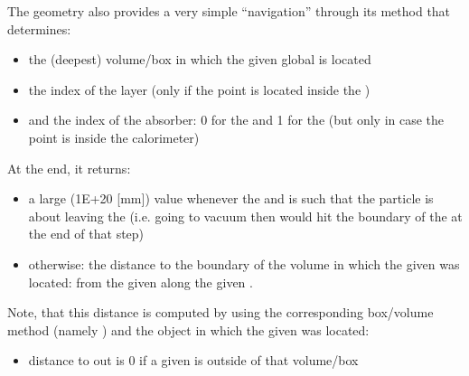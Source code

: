 \documentclass[letterpaper,10pt,english]{sphinxmanual}
\begin{document}
\begin{fulllineitems}
\sphinxAtStartPar
The geometry also provides a very simple “navigation” through its  method that determines:\begin{itemize}
\item {} 
\sphinxAtStartPar
the (deepest) volume/box in which the given global  is located

\item {} 
\sphinxAtStartPar
the index of the layer (only if the point is located inside the )

\item {} 
\sphinxAtStartPar
and the index of the absorber: 0 for the  and 1 for the  (but only in case the point is inside the calorimeter)

\end{itemize}


\sphinxAtStartPar
At the end, it returns:\begin{itemize}
\item {} 
\sphinxAtStartPar
a large (1E+20 {[}mm{]}) value whenever the  and  is such that the particle is about leaving the  (i.e. going to vacuum then would hit the boundary of the  at the end of that step)

\item {} 
\sphinxAtStartPar
otherwise: the distance to the boundary of the volume in which the given  was located: from the given  along the given .

\end{itemize}


\sphinxAtStartPar
Note, that this distance is computed by using the corresponding box/volume method (namely ) and the  object in which the given  was located:\begin{itemize}
\item {} 
\sphinxAtStartPar
distance to out is 0 if a given  is outside of that volume/box


\end{itemize}
\end{fulllineitems}
\end{document}
